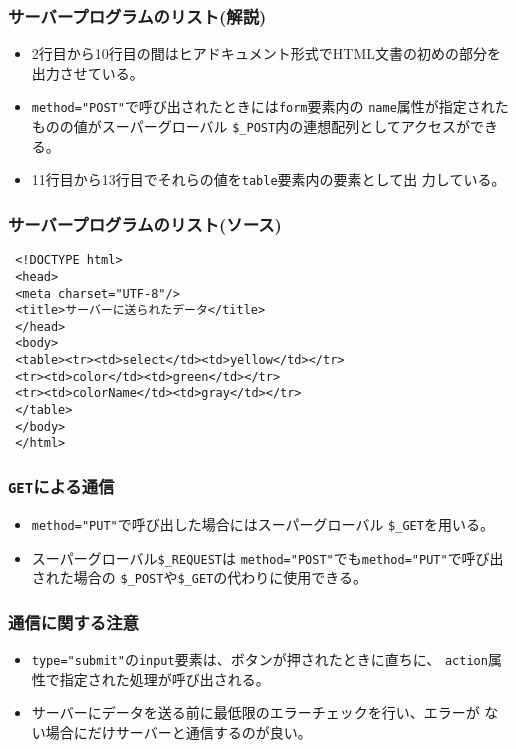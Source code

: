  \begin{frame}[containsverbatim]
 \frametitle{サーバープログラムのリスト(解説)}
 \begin{itemize}
 \item 2行目から10行目の間はヒアドキュメント形式でHTML文書の初めの部分を
       出力させている。
 \item \verb+method="POST"+で呼び出されたときには\texttt{form}要素内の
       \texttt{name}属性が指定されたものの値がスーパーグローバル
       \verb+$_POST+内の連想配列としてアクセスができる。
 \item 11行目から13行目でそれらの値を\texttt{table}要素内の要素として出
       力している。
 \end{itemize}
 \end{frame}
 \begin{frame}[containsverbatim]
 \frametitle{サーバープログラムのリスト(ソース)}
 \begin{verbatim}
 <!DOCTYPE html>
 <head>
 <meta charset="UTF-8"/>
 <title>サーバーに送られたデータ</title>
 </head>
 <body>
 <table><tr><td>select</td><td>yellow</td></tr>
 <tr><td>color</td><td>green</td></tr>
 <tr><td>colorName</td><td>gray</td></tr>
 </table>
 </body>
 </html>
 \end{verbatim}
 \end{frame}
 \begin{frame}[containsverbatim]
 \frametitle{\texttt{GET}による通信}
 \begin{itemize}
 \item \verb+method="PUT"+で呼び出した場合にはスーパーグローバル
 \verb+$_GET+を用いる。
 \item スーパーグローバル\verb+$_REQUEST+は
 \verb+method="POST"+でも\verb+method="PUT"+で呼び出された場合の
 \verb+$_POST+や\verb+$_GET+の代わりに使用できる。
 \end{itemize}
 \end{frame}
 \begin{frame}[containsverbatim]
 \frametitle{通信に関する注意}
 \begin{itemize}
 \item \verb+type="submit"+の\texttt{input}要素は、ボタンが押されたときに直ちに、
 \texttt{action}属性で指定された処理が呼び出される。
 \item サーバーにデータを送る前に最低限のエラーチェックを行い、エラーが
       ない場合にだけサーバーと通信するのが良い。
 \end{itemize}
 \end{frame}
